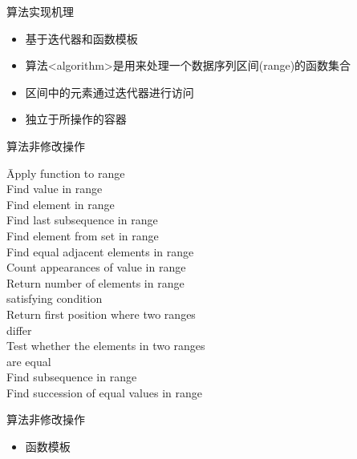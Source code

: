 \begin{frame}[t, fragile]{算法}{实现机理}
  \stretchon
  \begin{itemize}
  \item 基于迭代器和函数模板
  \item 算法<algorithm>是用来处理一个数据序列区间(range)的函数集合
  \item 区间中的元素通过迭代器进行访问
  \item 独立于所操作的容器
  \end{itemize}
  \stretchoff
\end{frame}

\begin{frame}[t, fragile]{算法}{非修改操作}
  \begin{tabbing}
     \hspace{3em} \=  Apply function to range\\
     \> Find value in range\\ 
     \> Find element in range\\
     \> Find last subsequence in range\\
     \> Find element from set in range\\ 
     \> Find equal adjacent elements in range\\ 
     \> Count appearances of value in range\\ 
     \> Return number of elements in range\\
                                    \> satisfying condition\\
     \> Return first position where two ranges\\
                                       \> differ\\
     \> Test whether the elements in two ranges\\
                                \>       are equal\\
     \> Find subsequence in range\\
     \> Find succession of equal values in range
  \end{tabbing}
\end{frame}

\begin{frame}[t, fragile]{算法}{非修改操作}
  \begin{itemize}
  \item {}函数模板
  \end{itemize}
  \begin{center}
  \end{center}
\end{frame}

